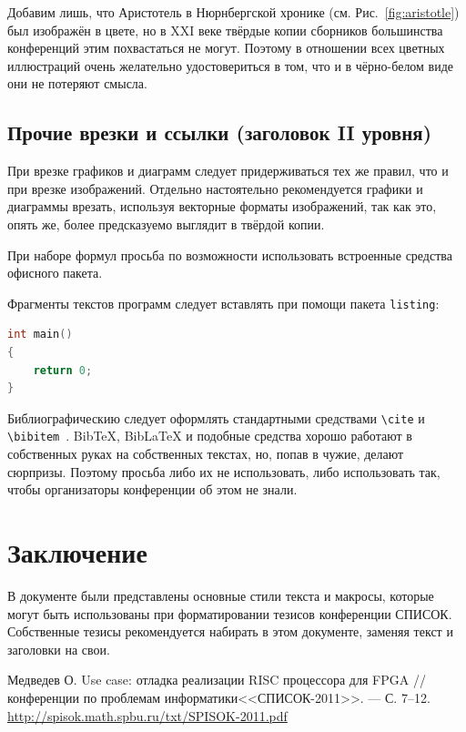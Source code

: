 \documentclass{spisok-article}
\begin{document}
Добавим лишь, что Аристотель в Нюрнбергской хронике
(см. Рис.~\ref{fig:aristotle}) был изображён в цвете, но в XXI веке
твёрдые копии сборников большинства конференций этим похвастаться не
могут. Поэтому в отношении всех цветных иллюстраций очень желательно
удостовериться в том, что и в чёрно-белом виде они не потеряют смысла.

\subsection{Прочие врезки и ссылки (заголовок II уровня)}

При врезке графиков и диаграмм следует придерживаться тех же правил,
что и при врезке изображений. Отдельно настоятельно рекомендуется
графики и диаграммы врезать, используя векторные форматы изображений,
так как это, опять же, более предсказуемо выглядит в твёрдой копии.

При наборе формул просьба по возможности использовать встроенные
средства офисного пакета.

Фрагменты текстов программ следует вставлять при помощи пакета
\texttt{listing}:

\begin{lstlisting}[language=C]
int main()
{
    return 0;
}
\end{lstlisting}

Библиографическию следует оформлять стандартными средствами
\texttt{\textbackslash{}cite} и
\texttt{\textbackslash{}bibitem}~\cite{medvedev2011}. BibTeX, BibLaTeX
и подобные средства хорошо работают в собственных руках на собственных
текстах, но, попав в чужие, делают сюрпризы.  Поэтому просьба либо их
не использовать, либо использовать так, чтобы организаторы конференции
об этом не знали.

\section{Заключение}

В документе были представлены основные стили текста и макросы, которые
могут быть использованы при форматировании тезисов конференции СПИСОК.
Собственные тезисы рекомендуется набирать в этом документе, заменяя
текст и заголовки на свои.

\renewcommand\refname{Литература}
\begin{thebibliography}{8}

 Медведев О. Use case: отладка реализации RISC
  процессора для FPGA // %
  конференции по проблемам информатики<<СПИСОК-2011>>. --- %
  С. 7--12.
  \href{http://spisok.math.spbu.ru/txt/SPISOK-2011.pdf}{http://spisok.math.spbu.ru/txt/SPISOK-2011.pdf}

\end{thebibliography}
\end{document}
